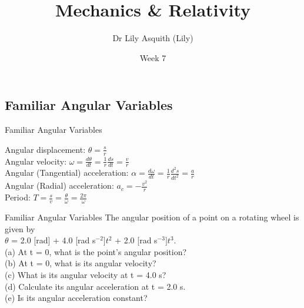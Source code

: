 


% 
\title[ Mechanics \& Relativity]{Mechanics \& Relativity}
\author[Dr Lily Asquith (Lily)]{ Dr Lily Asquith (Lily)}
\date[Week 7 ]{Week 7 }





\begin{frame}
\titlepage
\end{frame} 

 \subsection{ Familiar Angular Variables}
 
\begin{frame}{Familiar Angular Variables}
\small

Angular displacement: $\theta  = \frac{s}{r}$\\[2ex]
Angular velocity: $\omega  = \frac{d\theta}{dt} = \frac{1}{r} \frac{ds}{dt} = \frac{v}{r}$\\[2ex]
Angular (Tangential) acceleration: $\alpha  = \frac{d\omega}{dt} = \frac{1}{r} \frac{d^2s}{dt^2} = \frac{a}{r}$\\[2ex]
Angular (Radial) acceleration: $a_c  = - \frac{v^2}{r}$\\[2ex]
Period: $T = \frac{s}{v} = \frac{\theta}{\omega} = \frac{2\pi}{\omega}$\\[2ex]

\end{frame}

\begin{frame}{Familiar Angular Variables}
\small
The angular position of a point on a rotating wheel is given by\\[1ex]
 $\theta$ = 2.0 [rad] + 4.0 [rad s$^{-2}] t^2$ + 2.0 [rad s$^{-3}] t^3$.\\[2ex]
(a) At t = 0, what is the point's angular position? \\[1ex]
(b) At t = 0, what is its angular velocity? \\[5ex]
(c) What is its angular velocity at t = 4.0 s? \\[1ex]
(d) Calculate its angular acceleration at t = 2.0 s. \\[5ex]
(e) Is its angular acceleration constant?\\[1ex]
\vspace{5cm}
\end{frame}

